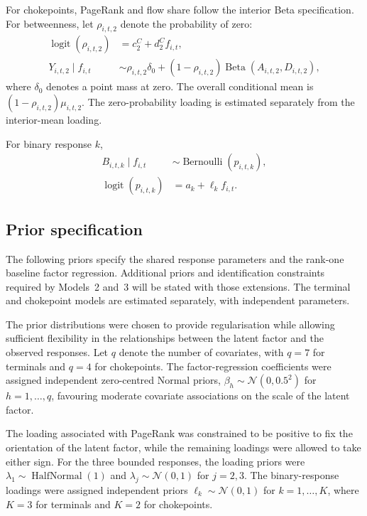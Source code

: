 \documentclass[pdftex,12pt,openright,a4paper,oneside]{book}
\begin{document}
For chokepoints, PageRank and flow share follow the interior Beta specification. 
For betweenness, let $\rho_{i,t,2}$ denote the probability of zero:
\begin{equation}
\begin{aligned}
 \operatorname{logit}(\rho_{i,t,2})
 &= c^{C}_2+d^{C}_2 f_{i,t},\\
 Y_{i,t,2}\mid f_{i,t}
 &\sim \rho_{i,t,2}\delta_0
 +(1-\rho_{i,t,2})
 \operatorname{Beta}(A_{i,t,2},D_{i,t,2}),
\end{aligned}
\label{eq:zero_inflated_beta}
\end{equation}
where $\delta_0$ denotes a point mass at zero. The overall conditional mean is $(1-\rho_{i,t,2})\mu_{i,t,2}$. 
The zero-probability loading is estimated separately from the interior-mean loading.

For binary response $k$,
\begin{align}
 B_{i,t,k}\mid f_{i,t}&\sim\operatorname{Bernoulli}(p_{i,t,k}),\\
 \operatorname{logit}(p_{i,t,k})&=a_k+\ell_k f_{i,t}.
\end{align}

\subsection{Prior specification}
\label{subsec:prior_distributions}

The following priors specify the shared response parameters and
the rank-one baseline factor regression. Additional priors and
identification constraints required by Models~2 and~3 will be
stated with those extensions. The terminal and chokepoint models
are estimated separately, with independent parameters.

The prior distributions were chosen to provide regularisation
while allowing sufficient flexibility in the relationships
between the latent factor and the observed responses. Let $q$
denote the number of covariates, with $q=7$ for terminals and
$q=4$ for chokepoints. The factor-regression coefficients were
assigned independent zero-centred Normal priors,
$\beta_h\sim\mathcal{N}(0,0.5^2)$ for $h=1,\ldots,q$, favouring
moderate covariate associations on the scale of the latent
factor.

The loading associated with PageRank was constrained to be
positive to fix the orientation of the latent factor, while
the remaining loadings were allowed to take either sign.
For the three bounded responses, the loading priors were
$\lambda_1\sim\operatorname{HalfNormal}(1)$ and
$\lambda_j\sim\mathcal{N}(0,1)$ for $j=2,3$.
The binary-response loadings were assigned independent priors
$\ell_k\sim\mathcal{N}(0,1)$ for $k=1,\ldots,K$, where $K=3$
for terminals and $K=2$ for chokepoints.
\end{document}

